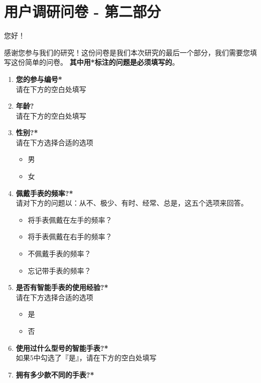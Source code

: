 

  \cleardoublepage


  \chapter{用户调研问卷 - 第二部分}
  \label{appendix:c}
  您好！

  感谢您参与我们的研究！这份问卷是我们本次研究的最后一个部分，我们需要您填写这份简单的问卷。
  \textbf{其中用*标注的问题是必须填写的}。

  \begin{enumerate}
      \kaishu
      \item \textbf{您的参与编号*}\\
      请在下方的空白处填写
      \item \textbf{年龄?}\\
      请在下方的空白处填写
      \item \textbf{性别?*}\\
      请在下方选择合适的选项
      \begin{itemize}
          \item 男
          \item 女
      \end{itemize}
      \item \textbf{佩戴手表的频率?*}\\
      请对下方的问题以：从不、极少、有时、经常、总是，这五个选项来回答。
      \begin{itemize}
          \item 将手表佩戴在左手的频率？
          \item 将手表佩戴在右手的频率？
          \item 不佩戴手表的频率？
          \item 忘记带手表的频率？
      \end{itemize}
      \item \textbf{是否有智能手表的使用经验?*}\\
      请在下方选择合适的选项
      \begin{itemize}
          \item 是
          \item 否
      \end{itemize}
      \item \textbf{使用过什么型号的智能手表?*}\\
      如果5中勾选了『是』，请在下方的空白处填写
      \item \textbf{拥有多少款不同的手表?*}\\

\end{enumerate}
